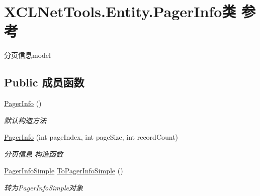 \hypertarget{class_x_c_l_net_tools_1_1_entity_1_1_pager_info}{\section{X\-C\-L\-Net\-Tools.\-Entity.\-Pager\-Info类 参考}
\label{class_x_c_l_net_tools_1_1_entity_1_1_pager_info}
}


分页信息model  


\subsection*{Public 成员函数}
\begin{DoxyCompactItemize}
\item 
\hyperlink{class_x_c_l_net_tools_1_1_entity_1_1_pager_info_a775ef53e33f2270d097eb34e257dc925}{Pager\-Info} ()
\begin{DoxyCompactList}\small\item\em 默认构造方法 \end{DoxyCompactList}\item 
\hyperlink{class_x_c_l_net_tools_1_1_entity_1_1_pager_info_a942f7268d84ce1d1533b678acb7104c6}{Pager\-Info} (int page\-Index, int page\-Size, int record\-Count)
\begin{DoxyCompactList}\small\item\em 分页信息 构造函数 \end{DoxyCompactList}\item 
\hyperlink{class_x_c_l_net_tools_1_1_entity_1_1_pager_info_simple}{Pager\-Info\-Simple} \hyperlink{class_x_c_l_net_tools_1_1_entity_1_1_pager_info_af2b14d5cb33aa660580dc612a0f7b6c8}{To\-Pager\-Info\-Simple} ()
\begin{DoxyCompactList}\small\item\em 转为\-Pager\-Info\-Simple对象 \end{DoxyCompactList}\end{DoxyCompactItemize}
